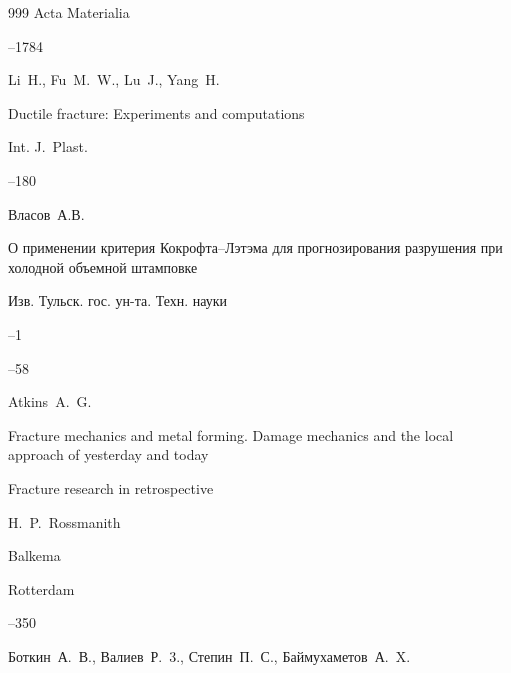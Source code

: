 \begin{thebibliography}{999}
\jour Acta Materialia




--1784






\by Li~H., Fu~M.~W., Lu~J., Yang~H. 

\paper Ductile fracture: Experiments and computations

\jour Int. J.~Plast.  




--180






\by Власов~А.В.

\paper О применении критерия Кокрофта--Лэтэма для прогнозирования разрушения при холодной объемной штамповке

\jour Изв. Тульск. гос. ун-та. Техн. науки


--1

--58




\by  Atkins~A.~G.

\paper Fracture mechanics and metal forming. Damage mechanics and the local approach of yesterday and today

\inbook Fracture research in retrospective

\eds H.~P.~Rossmanith

\publ Balkema

\publaddr Rotterdam


–350





\by  Боткин~А.~В., Валиев~Р.~3., Степин~П.~С., Баймухаметов~А.~X.


\end{thebibliography}
